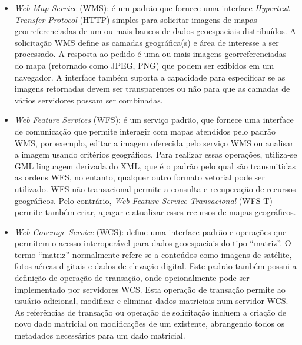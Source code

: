 \begin{itemize}
\item \textit{Web Map Service} (WMS): é um padrão que fornece uma interface \textit{Hypertext Transfer Protocol} (HTTP) simples para solicitar imagens de mapas georreferenciadas de um ou mais bancos de dados geoespaciais distribuídos. A solicitação WMS define as camadas geográfica(s) e área de interesse a ser processado. A resposta ao pedido é uma ou mais imagens georreferenciadas do mapa (retornado como JPEG, PNG) que podem ser exibidos em um navegador. A interface também suporta a capacidade para especificar se as imagens retornadas devem ser transparentes ou não para que as camadas de vários servidores possam ser combinadas.
\item \textit{Web Feature Services} (WFS): é um serviço padrão, que fornece uma interface de comunicação que permite interagir com mapas atendidos pelo padrão WMS, por exemplo, editar a imagem oferecida pelo serviço WMS ou analisar a imagem usando critérios geográficos. Para realizar essas operações, utiliza-se GML linguagem derivada do XML, que é o padrão pelo qual são transmitidas as ordens WFS, no entanto, qualquer outro formato vetorial pode ser utilizado. WFS não transacional permite a consulta e recuperação de recursos geográficos. Pelo contrário, \textit{Web Feature Service Transacional} (WFS-T) permite também criar, apagar e atualizar esses recursos de mapas geográficos.
\item \textit{Web Coverage Service} (WCS): define uma interface padrão e operações que permitem o acesso interoperável para dados geoespaciais do tipo “matriz”. O termo “matriz” normalmente refere-se a conteúdos como imagens de satélite, fotos aéreas digitais e dados de elevação digital. Este padrão também possui a definição de operação de transação, onde opcionalmente pode ser implementado por servidores WCS. Esta operação de transação permite ao usuário adicional, modificar e eliminar dados matriciais num servidor WCS. As referências de transação ou operação de solicitação incluem a criação de novo dado matricial ou modificações de um existente, abrangendo todos os metadados necessários para um dado matricial.
\end{itemize}